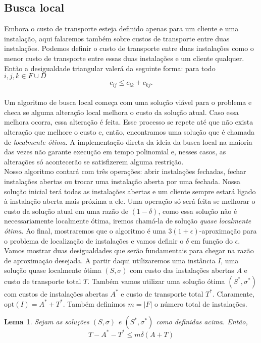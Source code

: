 \documentclass[12pt]{article}
\newcommand{\opt}{\ensuremath{\mathrm{opt}}}
\newtheorem{lemma}[theorem]{Lema}
\begin{document}
\subsection{Busca local}
Embora o custo de transporte esteja definido apenas para um cliente e uma instalação, aqui falaremos também sobre custos de transporte entre duas instalações. Podemos definir o custo de transporte entre duas instalações como o menor custo de transporte entre essas duas instalações e um cliente qualquer. Então a desigualdade triangular valerá da seguinte forma: para todo $i,j,k \in F \cup D$ 
\[ c_{ij} \leq c_{ik} + c_{kj}.\]\\
Um algoritmo de busca local começa com uma solução viável para o problema e checa se alguma alteração local melhora o custo da solução atual. Caso essa melhora ocorra, essa alteração é feita. Esse processo se repete até que não exista alteração que melhore o custo e, então, encontramos uma solução que é chamada de \emph{localmente ótima}. A implementação direta da ideia da busca local na maioria das vezes não garante execução em tempo polinomial e, nesses casos, as alterações só acontecerão se satisfizerem alguma restrição. \\
Nosso algoritmo contará com três operações: abrir instalações fechadas, fechar instalações abertas ou trocar uma instalação aberta por uma fechada. Nossa solução inicial terá todas as instalações abertas e um cliente sempre estará ligado à instalação aberta mais próxima a ele. Uma operação só será feita se melhorar o custo da solução atual em uma razão de $(1-\delta)$, como essa solução não é necessariamente localmente ótima, iremos chamá-la de solução \emph{quase localmente ótima}. Ao final, mostraremos que o algoritmo é uma $3(1 + \epsilon)$-aproximação para o problema de localização de instalações e vamos definir o $\delta$ em função do $\epsilon$. \\
Vamos mostrar duas desigualdades que serão fundamentais para chegar na razão de aproximação desejada. A partir daqui utilizaremos uma instância $I$, uma solução quase localmente ótima $(S,\sigma)$ com custo das instalações abertas $A$ e custo de transporte total $T$. Também vamos utilizar uma solução ótima $(S^*,\sigma^*)$ com custos de instalações abertas $A^*$ e custo de transporte total $T^*$. Claramente, $\opt(I) = A^* + T^*$. Também definimos $m = |F|$ o número total de instalações.
\begin{lemma}
    \label{lema:3.7}
    Sejam as soluções $(S,\sigma)$ e $(S^*,\sigma^*)$ como definidas acima. Então,
    \[ T - A^* - T^* \leq m \delta (A+T)\]
\end{lemma}
\end{document}
